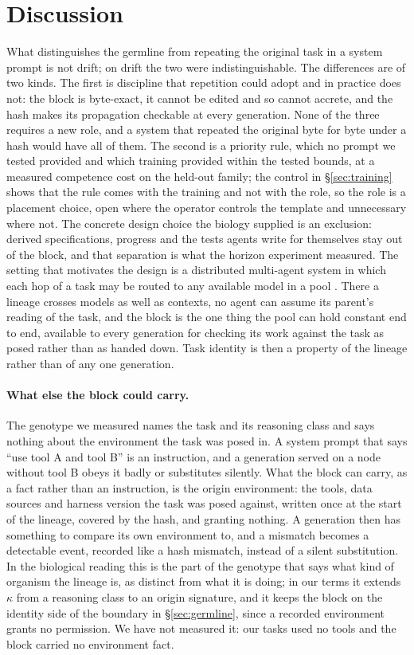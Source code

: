 \documentclass[11pt]{article}
\begin{document}
\section{Discussion}

What distinguishes the germline from repeating the original task in a system prompt is not drift; on drift the two were indistinguishable. The differences are of two kinds. The first is discipline that repetition could adopt and in practice does not: the block is byte-exact, it cannot be edited and so cannot accrete, and the hash makes its propagation checkable at every generation. None of the three requires a new role, and a system that repeated the original byte for byte under a hash would have all of them. The second is a priority rule, which no prompt we tested provided and which training provided within the tested bounds, at a measured competence cost on the held-out family; the control in \S\ref{sec:training} shows that the rule comes with the training and not with the role, so the role is a placement choice, open where the operator controls the template and unnecessary where not. The concrete design choice the biology supplied is an exclusion: derived specifications, progress and the tests agents write for themselves stay out of the block, and that separation is what the horizon experiment measured. The setting that motivates the design is a distributed multi-agent system in which each hop of a task may be routed to any available model in a pool \citep{entropi2026}. There a lineage crosses models as well as contexts, no agent can assume its parent's reading of the task, and the block is the one thing the pool can hold constant end to end, available to every generation for checking its work against the task as posed rather than as handed down. Task identity is then a property of the lineage rather than of any one generation.

\paragraph{What else the block could carry.} The genotype we measured names the task and its reasoning class and says nothing about the environment the task was posed in. A system prompt that says ``use tool A and tool B'' is an instruction, and a generation served on a node without tool B obeys it badly or substitutes silently. What the block can carry, as a fact rather than an instruction, is the origin environment: the tools, data sources and harness version the task was posed against, written once at the start of the lineage, covered by the hash, and granting nothing. A generation then has something to compare its own environment to, and a mismatch becomes a detectable event, recorded like a hash mismatch, instead of a silent substitution. In the biological reading this is the part of the genotype that says what kind of organism the lineage is, as distinct from what it is doing; in our terms it extends $\kappa$ from a reasoning class to an origin signature, and it keeps the block on the identity side of the boundary in \S\ref{sec:germline}, since a recorded environment grants no permission. We have not measured it: our tasks used no tools and the block carried no environment fact.
\end{document}
